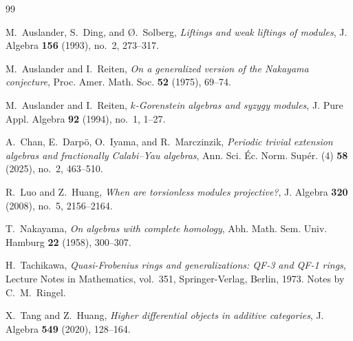 \documentclass[a4paper,reqno,10pt]{amsart}
\theoremstyle{definition}
\numberwithin{equation}{section}
\begin{document}
\begin{thebibliography}{99}

M.~Auslander, S.~Ding, and {\O}.~Solberg,
\emph{Liftings and weak liftings of modules},
J. Algebra \textbf{156} (1993), no.~2, 273--317.

M.~Auslander and I.~Reiten,
\emph{On a generalized version of the Nakayama conjecture},
Proc. Amer. Math. Soc. \textbf{52} (1975), 69--74.

M.~Auslander and I.~Reiten,
\emph{$k$-Gorenstein algebras and syzygy modules},
J. Pure Appl. Algebra \textbf{92} (1994), no.~1, 1--27.

A.~Chan, E.~Darp\"o, O.~Iyama, and R.~Marczinzik,
\emph{Periodic trivial extension algebras and fractionally Calabi--Yau
algebras}, Ann. Sci. \'Ec. Norm. Sup\'er. (4) \textbf{58} (2025), no.~2,
463--510.

R.~Luo and Z.~Huang,
\emph{When are torsionless modules projective?},
J. Algebra \textbf{320} (2008), no.~5, 2156--2164.

T.~Nakayama,
\emph{On algebras with complete homology},
Abh. Math. Sem. Univ. Hamburg \textbf{22} (1958), 300--307.

H.~Tachikawa,
\emph{Quasi-Frobenius rings and generalizations: QF-3 and QF-1 rings},
Lecture Notes in Mathematics, vol.~351, Springer-Verlag, Berlin, 1973.
Notes by C.~M.~Ringel.

X.~Tang and Z.~Huang,
\emph{Higher differential objects in additive categories},
J. Algebra \textbf{549} (2020), 128--164.

\end{thebibliography}
\end{document}
